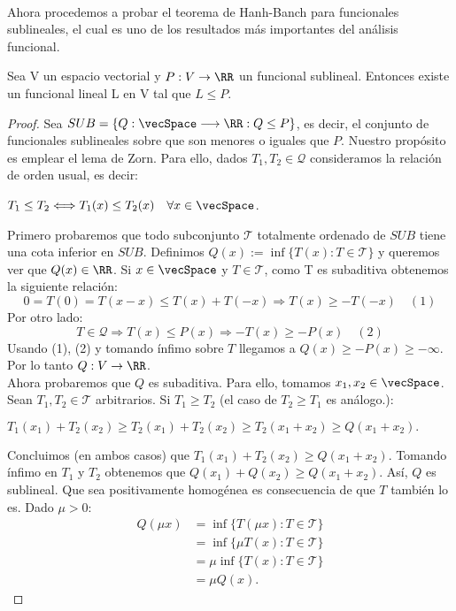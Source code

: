 	\paragraph{} Ahora procedemos a probar el teorema de Hanh-Banch para funcionales sublineales, el cual es uno de los resultados más importantes del análisis funcional.	
	\begin{teoremaBox}\label{H-B}
		Sea V un espacio vectorial y $P:V \rightarrow \RR$ un funcional sublineal. Entonces existe un funcional lineal L en V tal que $ L \leq P $.
	\end{teoremaBox}
	\begin{proof}
		Sea $ SUB = \lbrace Q:\vecSpace \longrightarrow \RR : Q \leq P \rbrace$, es decir, el conjunto de funcionales sublineales sobre \vecSpace que son menores o iguales que $ P $. Nuestro propósito es emplear el lema de Zorn. Para ello, dados $ T_1 ,T_2 \in \mathcal{Q} $ consideramos la relación de orden usual, es decir:
		\begin{center}
			$ T_1 \leq T_2 \Longleftrightarrow T_1 (x) \leq T_2 (x) \quad \forall x \in \vecSpace $.
		\end{center}
		Primero probaremos que todo subconjunto $ \mathcal{T} $ totalmente ordenado de $SUB $ tiene una cota inferior en $ SUB $. Definimos $ Q(x):=\inf \{ T(x): T \in \mathcal{T} \} $ y queremos ver que $ Q(x) \in \RR $. Si $ x \in \vecSpace $ y $ T \in \mathcal{T} $, como T es subaditiva obtenemos la siguiente relación:
		\[ 0 = T(0) = T(x-x) \leq T(x) + T(-x) \Longrightarrow T(x) \geq -T(-x) \quad (1)\]  
		Por otro lado:
		\[ T \in \mathcal{Q} \Longrightarrow T(x) \leq P(x) \Longrightarrow -T(x) \geq -P(x) \quad (2)\] 
		Usando (1), (2) y tomando ínfimo sobre $  T $  llegamos a $ Q(x) \geq -P(x) \geq - \infty $. Por lo tanto $ Q:V \rightarrow \RR$. \\
		
		Ahora probaremos que $ Q $ es subaditiva. Para ello, tomamos $ x_1, x_2\in \vecSpace $. Sean $ T_1 , T_2 \in \mathcal{T} $ arbitrarios. Si $ T_1 \geq T_2 $ (el caso de $ T_2 \geq T_1 $ es análogo.):
		
		\begin{center}
			$ T_1 (x_1)+  T_2 (x_2) \geq T_2(x_1)+  T_2 (x_2) \geq T_2(x_1 +x_2) \geq Q(x_1 + x_2).$
		\end{center}
		Concluimos (en ambos casos) que $ T_1 (x_1)+  T_2 (x_2) \geq Q(x_1 + x_2)$. Tomando ínfimo en $ T_1 $ y $ T_2 $ obtenemos que $ Q (x_1)+  Q(x_2) \geq Q(x_1 + x_2)$. Así, $ Q $ es sublineal. Que sea positivamente homogénea es consecuencia de que $ T $ también lo es. Dado $ \mu > 0 $:
		\begin{equation*}
		\begin{split}
		Q(\mu x) &=\inf \{ T(\mu x): T \in \mathcal{T} \} \\ 
		& = \inf \{ \mu T( x): T \in \mathcal{T} \} \\ 
		&= \mu\inf \{ T( x): T \in \mathcal{T} \} \\ 
		&= \mu Q(x). 
		\end{split}
		\end{equation*}
		

\end{proof}
